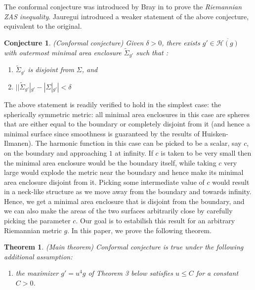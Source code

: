 \documentclass{amsart}
\newcommand{\ts}{\tilde{\Sigma}}
\newtheorem{theorem}{Theorem}
\newtheorem{conjecture}{Conjecture}
\theoremstyle{named}
\begin{document}
The conformal conjecture was introduced by Bray in \cite{Bray:2009voj} to prove the \textit{Riemannian ZAS inequality}. Jauregui \cite{jeff} introduced a weaker statement of the above conjecture, equivalent to the original. 

\begin{conjecture} \label{conjecture:conf_conj} (Conformal conjecture)
    Given $\delta > 0$, there exists $g' \in \overline{\mathcal{H}(g)}$ with outermost minimal area enclosure $\ts_{g'}$ such that : 
    \begin{enumerate}
        \item $\ts_{g'}$ is disjoint from $\Sigma$, and
        \item $| |\ts_{g'}|_{g'} - |\Sigma|_{g'} | < \delta$ 
    \end{enumerate}
\end{conjecture}

The above statement is readily verified to hold in the simplest case: the spherically symmetric metric: all minimal area enclosures in this case are spheres that are either equal to the boundary or completely disjoint from it (and hence a minimal surface since smoothness is guaranteed by the results of Huisken-Ilmanen). The harmonic function in this case can be picked to be a scalar, say $c$, on the boundary and approaching $1$ at infinity. If $c$ is taken to be very small then the minimal area enclosure would be the boundary itself, while taking $c$ very large would explode the metric near the boundary and hence make its minimal area enclosure disjoint from it. Picking some intermediate value of $c$ would result in a neck-like structure as we move away from the boundary and towards infinity. Hence, we get a minimal area enclosure that is disjoint from the boundary, and we can also make the areas of the two surfaces arbitrarily close by carefully picking the parameter $c$. Our goal is to estabilish this result for an arbitrary Riemannian metric $g$. In this paper, we prove the following theorem. 

\begin{theorem} \label{theorem: main_theorem} (Main theorem)
    Conformal conjecture is true under the following additional assumption:
    \begin{enumerate}
        \item the maximizer $g' = u^4g$ of Theorem 3 below satisfies $u \leq C$ for a constant $C > 0$.
    \end{enumerate}
\end{theorem}
\end{document}
